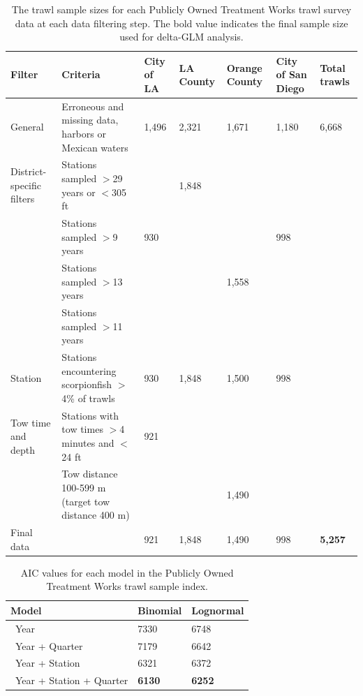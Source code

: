 \documentclass[12pt,]{article}
\begin{document}
\begin{table}[ht]
\centering
\caption{The trawl sample sizes for each
                                          Publicly Owned Treatment Works 
                                          trawl survey data at each data filtering step.  
                                          The bold value indicates the final sample size 
                                          used for delta-GLM analysis.} 
\label{tab:Fleet7_Sanitation_filter}
\begin{tabular}{>{\raggedright}p{.8in}>{\raggedright}p{2in}>{\raggedright}p{.6in}>{\raggedright}p{.6in}>{\raggedright}p{.6in}>{\raggedright}p{.8in}>{\raggedright}p{.6in}}
  \hline
Filter & Criteria & City of LA & LA County & Orange County & City of San Diego & Total trawls \\ 
  \hline
General & Erroneous and missing data, harbors or Mexican waters & 1,496 & 2,321 & 1,671 & 1,180 & 6,668 \\ 
  District-specific filters & Stations sampled $>$29 years or $<$305 ft &  & 1,848 &  &  &  \\ 
   & Stations sampled $>$9 years & 930 &  &  & 998 &  \\ 
   & Stations sampled $>$13 years &  &  & 1,558 &  &  \\ 
   & Stations sampled $>$11 years &  &  &  &  &  \\ 
  Station & Stations encountering scorpionfish $>$4\% of trawls & 930 & 1,848 & 1,500 & 998 &  \\ 
  Tow time and depth & Stations with tow times $>$4 minutes and $<$24 ft & 921 &  &  &  &  \\ 
   & Tow distance 100-599 m (target tow distance 400 m) &  &  & 1,490 &  &  \\ 
  Final data &  & 921 & 1,848 & 1,490 & 998 & \textbf{5,257} \\ 
   \hline
\end{tabular}
\end{table}\vspace{2in}

\begin{table}[ht]
\centering
\caption{AIC values for each model in the
                                         Publicly Owned Treatment Works trawl sample 
                                          index.} 
\label{tab:Fleet7_Sanitation_aic}
\begin{tabular}{lll}
  \hline
Model & Binomial & Lognormal \\ 
  \hline
~Year & 7330 & 6748 \\ 
  ~Year + Quarter & 7179 & 6642 \\ 
  ~Year + Station & 6321 & 6372 \\ 
  ~Year + Station + Quarter & \textbf{6130} & \textbf{6252} \\ 
   \hline
\end{tabular}
\end{table}\vspace{2in}
\end{document}
